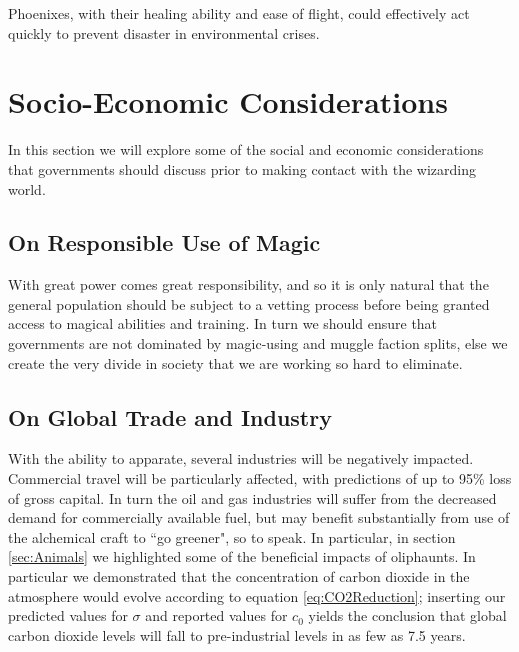 \documentclass[]{article}
\begin{document}
Phoenixes, with their healing ability and ease of flight, could effectively act quickly to prevent disaster in environmental crises.

\section{Socio-Economic Considerations}
In this section we will explore some of the social and economic considerations that governments should discuss prior to making contact with the wizarding world.

\subsection*{On Responsible Use of Magic}
With great power comes great responsibility, and so it is only natural that the general population should be subject to a vetting process before being granted access to magical abilities and training.
In turn we should ensure that governments are not dominated by magic-using and muggle faction splits, else we create the very divide in society that we are working so hard to eliminate.

\subsection*{On Global Trade and Industry} 
With the ability to apparate, several industries will be negatively impacted.
Commercial travel will be particularly affected, with predictions of up to 95\% loss of gross capital.
In turn the oil and gas industries will suffer from the decreased demand for commercially available fuel, but may benefit substantially from use of the alchemical craft to ``go greener", so to speak.
In particular, in section \ref{sec:Animals} we highlighted some of the beneficial impacts of oliphaunts.
In particular we demonstrated that the concentration of carbon dioxide in the atmosphere would evolve according to equation \ref{eq:CO2Reduction}; inserting our predicted values for $\sigma$ and reported values for $c_{0}$ yields the conclusion that global carbon dioxide levels will fall to pre-industrial levels in as few as 7.5 years.

 
\end{document}
